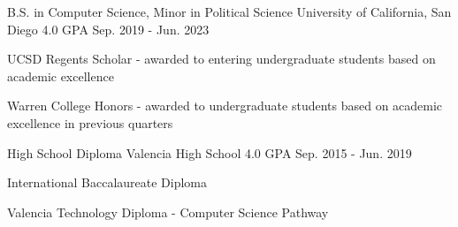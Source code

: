 

\begin{cventries}

    \cventry
    {B.S. in Computer Science, Minor in Political Science} %
    {University of California, San Diego} %
    {4.0 GPA} %
    {Sep. 2019 - Jun. 2023} %
    {
      \begin{cvitems} %
        \item {UCSD Regents Scholar - awarded to entering undergraduate students based on academic excellence}
        \item {Warren College Honors - awarded to undergraduate students based on academic excellence in previous quarters}
      \end{cvitems}
    }
    
    \cventry
    {High School Diploma} %
    {Valencia High School} %
    {4.0 GPA} %
    {Sep. 2015 - Jun. 2019} %
    {
      \begin{cvitems} %
        \item {International Baccalaureate Diploma}
        \item {Valencia Technology Diploma - Computer Science Pathway}
      \end{cvitems}
    }

\end{cventries}

